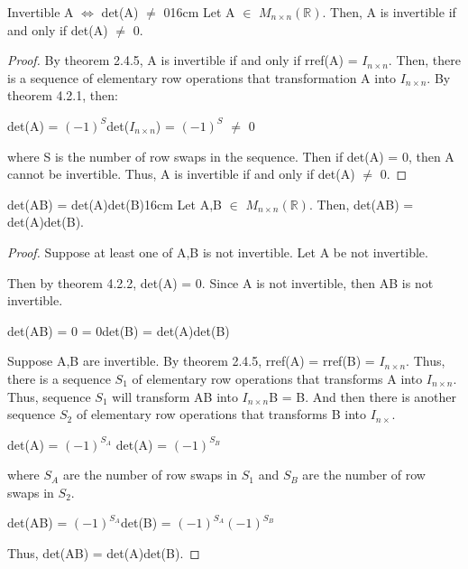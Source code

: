     \vspace{0.5cm}



    \begin{wtheorem}{Invertible A $\Leftrightarrow$ det(A) $\not =$ 0}{16cm}
        Let A $\in$ $M_{n \times n}(\mathbb{R})$.
        Then, A is invertible if and only if det(A) $\not =$ 0.
    \end{wtheorem}

    \begin{proof}
        By {\color{red} theorem 2.4.5}, A is invertible if and only if
        rref(A) = $I_{n \times n}$.
        Then, there is a sequence of elementary row operations that
        transformation A into $I_{n \times n}$.
        By {\color{red} theorem 4.2.1}, then:

        \hspace{0.5cm}
        det(A) = $(-1)^S$det($I_{n \times n}$) = $(-1)^S$ $\not =$ 0

        where S is the number of row swaps in the sequence.
        Then if det(A) = 0, then A cannot be invertible.
        Thus, A is invertible if and only if det(A) $\not =$ 0.
    \end{proof}

    \newpage



    \begin{wtheorem}{det(AB) = det(A)det(B)}{16cm}
        Let A,B $\in$ $M_{n \times n}(\mathbb{R})$. Then,
        det(AB) = det(A)det(B).
    \end{wtheorem}

    \begin{proof}
        Suppose at least one of A,B is not invertible.
        Let A be not invertible.

        Then by {\color{red} theorem 4.2.2}, det(A) = 0.
        Since A is not invertible, then AB is not invertible.

        \hspace{0.5cm}
        det(AB) = 0 = 0det(B) = det(A)det(B)

        Suppose A,B are invertible. By {\color{red} theorem 2.4.5},
        rref(A) = rref(B) = $I_{n \times n}$.
        Thus, there is a sequence $S_1$ of elementary row operations
        that transforms A into $I_{n \times n}$.
        Thus, sequence $S_1$ will transform AB into $I_{n \times n}$B = B.
        And then there is another sequence $S_2$
        of elementary row operations that transforms B into $I_{n \times}$.
    
        \hspace{0.5cm}
        det(A) = $(-1)^{S_A}$
        \hspace{1cm}
        det(A) = $(-1)^{S_B}$

        where $S_A$ are the number of row swaps in $S_1$
        and $S_B$ are the number of row swaps in $S_2$.

        \hspace{0.5cm}
        det(AB) = $(-1)^{S_A}$det(B) = $(-1)^{S_A} (-1)^{S_B}$

        Thus, det(AB) = det(A)det(B).
    \end{proof}

